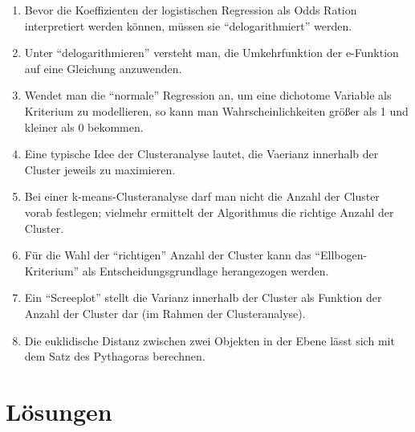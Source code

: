 \documentclass[12pt,ngerman,]{book}
\theoremstyle{definition}
\theoremstyle{definition}
\theoremstyle{remark}
\begin{document}
\begin{enumerate}
\def\labelenumi{\arabic{enumi}.}
\setcounter{enumi}{32}
\item
  Bevor die Koeffizienten der logistischen Regression als Odds Ration
  interpretiert werden können, müssen sie ``delogarithmiert'' werden.
\item
  Unter ``delogarithmieren'' versteht man, die Umkehrfunktion der
  e-Funktion auf eine Gleichung anzuwenden.
\item
  Wendet man die ``normale'' Regression an, um eine dichotome Variable
  als Kriterium zu modellieren, so kann man Wahrscheinlichkeiten größer
  als 1 und kleiner als 0 bekommen.
\item
  Eine typische Idee der Clusteranalyse lautet, die Vaerianz innerhalb
  der Cluster jeweils zu maximieren.
\item
  Bei einer k-means-Clusteranalyse darf man nicht die Anzahl der Cluster
  vorab festlegen; vielmehr ermittelt der Algorithmus die richtige
  Anzahl der Cluster.
\item
  Für die Wahl der ``richtigen'' Anzahl der Cluster kann das
  ``Ellbogen-Kriterium'' als Entscheidungsgrundlage herangezogen werden.
\item
  Ein ``Screeplot'' stellt die Varianz innerhalb der Cluster als
  Funktion der Anzahl der Cluster dar (im Rahmen der Clusteranalyse).
\item
  Die euklidische Distanz zwischen zwei Objekten in der Ebene lässt sich
  mit dem Satz des Pythagoras berechnen.
\end{enumerate}

\section{Lösungen}\label{losungen-1}
\end{document}
